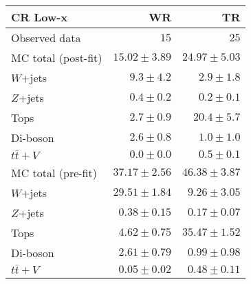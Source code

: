 \begin{table}
  \begin{center}
    \caption{ \label{tab::BGestimation::CRyields_Lowx}   }

    \begin{tabular*}{\textwidth}{@{\extracolsep{\fill}}lrr}
      \toprule
      \textbf{CR Low-x} & WR & TR \\
      \midrule


Observed data & $15$ & $25$ \\
\midrule
\midrule
MC total (post-fit) & $15.02 \pm 3.89$ & $24.97 \pm 5.03$ \\
\midrule
$W$+jets & $9.3 \pm 4.2$ & $2.9 \pm 1.8$ \\
$Z$+jets & $0.4 \pm 0.2$ & $0.2 \pm 0.1$ \\
Tops & $2.7 \pm 0.9$ & $20.4 \pm 5.7$ \\
Di-boson & $2.6 \pm 0.8$ & $1.0 \pm 1.0$ \\
$t\bar{t}+V$ & $0.0 \pm 0.0$ & $0.5 \pm 0.1$ \\
\midrule
\midrule
MC total (pre-fit) & $37.17 \pm 2.56$ & $46.38 \pm 3.87$ \\
\midrule
$W$+jets & $29.51 \pm 1.84$ & $9.26 \pm 3.05$ \\
$Z$+jets & $0.38 \pm 0.15$ & $0.17 \pm 0.07$ \\
Tops & $4.62 \pm 0.75$ & $35.47 \pm 1.52$ \\
Di-boson & $2.61 \pm 0.79$ & $0.99 \pm 0.98$ \\
$t\bar{t}+V$ & $0.05 \pm 0.02$ & $0.48 \pm 0.11$ \\
    \bottomrule
    \end{tabular*}
    
  \end{center}
\end{table}


